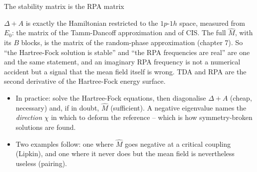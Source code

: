 \documentclass[aspectratio=169,10pt]{beamer}
\newcommand{\mbbox}[1]{%
  \begin{tcolorbox}[colback=paleblue,colframe=uioblue,title={\bfseries Many-body connection}]
  #1
  \end{tcolorbox}}
\begin{document}
\begin{frame}{The stability matrix is the RPA matrix}
  \small
  \mbbox{$\Delta+A$ is exactly the Hamiltonian restricted to the $1p$-$1h$ space, measured from $E_0$: the matrix of the Tamm-Dancoff approximation and of CIS. The full $\hat{M}$, with its $B$ blocks, is the matrix of the random-phase approximation (chapter 7). So ``the Hartree-Fock solution is stable'' and ``the RPA frequencies are real'' are one and the same statement, and an imaginary RPA frequency is not a numerical accident but a signal that the mean field itself is wrong. TDA and RPA are the second derivative of the Hartree-Fock energy surface.}
  \vspace{0.4em}
  \begin{itemize}
    \item In practice: solve the Hartree-Fock equations, then diagonalise $\Delta+A$ (cheap, necessary) and, if in doubt, $\hat{M}$ (sufficient). A negative eigenvalue names the \emph{direction} $\chi$ in which to deform the reference -- which is how symmetry-broken solutions are found.
    \item Two examples follow: one where $\hat{M}$ goes negative at a critical coupling (Lipkin), and one where it never does but the mean field is nevertheless useless (pairing).
  \end{itemize}
\end{frame}
\end{document}
